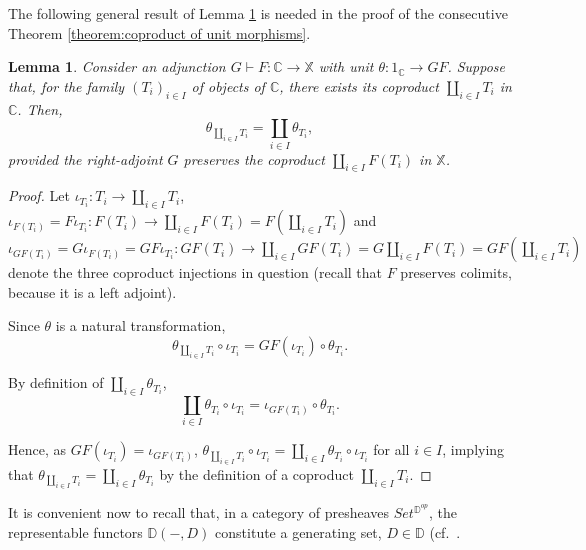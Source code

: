 \documentclass[12pt,a4paper]{amsart}
\newtheorem{lemma}{Lemma}[section]
\theoremstyle{definition}
\begin{document}
The following general result of Lemma \ref{lemma:unit of coproduct = coproduct of units} is needed in the proof of the consecutive Theorem \ref{theorem:coproduct of unit morphisms}.

\begin{lemma}\label{lemma:unit of coproduct = coproduct of units}
Consider an adjunction $G\vdash F:\mathbb{C}\rightarrow \mathbb{X}$ with unit $\theta:1_\mathbb{C}\rightarrow GF$. Suppose that, for the family $(T_i)_{i\in I}$ of objects of $\mathbb{C}$, there exists its coproduct $\coprod_{i\in I}T_i$ in $\mathbb{C}$. Then, $$\theta_{\coprod_{i\in I}T_i}=\coprod_{i\in I}\theta_{T_i},$$ provided the right-adjoint $G$ preserves the coproduct $\coprod_{i\in I}F(T_i)$ in $\mathbb{X}$.
\end{lemma}
\begin{proof}
Let $\iota_{T_i}:T_i\rightarrow \coprod_{i\in I}T_i$, $\iota_{F(T_i)}=F\iota_{T_i}:F(T_i)\rightarrow \coprod_{i\in I}F(T_i)=F(\coprod_{i\in I}T_i)$ and $\iota_{GF(T_i)}=G\iota_{F(T_i)}=GF\iota_{T_i}:GF(T_i)\rightarrow \coprod_{i\in I}GF(T_i)=G\coprod_{i\in I}F(T_i)=GF(\coprod_{i\in I}T_i)$ denote the three coproduct injections in question (recall that $F$ preserves colimits, because it is a left adjoint).

Since $\theta$ is a natural transformation, $$\theta_{\coprod_{i\in I}T_i}\circ\iota_{T_i}=GF(\iota_{T_i})\circ\theta_{T_i}.$$

By definition of $\coprod_{i\in I}\theta_{T_i}$, $$\coprod_{i\in I}\theta_{T_i}\circ\iota_{T_i}=\iota_{GF( T_i)}\circ\theta_{T_i}.$$

Hence, as $GF(\iota_{T_i})=\iota_{GF( T_i)}$, $\theta_{\coprod_{i\in I}T_i}\circ\iota_{T_i}=\coprod_{i\in I}\theta_{T_i}\circ\iota_{T_i}$ for all $i\in I$, implying that $\theta_{\coprod_{i\in I}T_i}=\coprod_{i\in I}\theta_{T_i}$ by the definition of a coproduct $\coprod_{i\in I}T_i$.\end{proof}

It is convenient now to recall that, in a category of presheaves $Set^{\mathbb{D}^{op}}$, the representable functors $\mathbb{D}(-,D)$ constitute a generating set, $D\in\mathbb{D}$ (cf.\ \cite[\S III.7]{SM:cat}.
\end{document}
